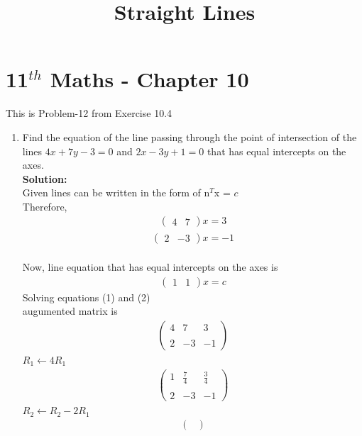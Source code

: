 \documentclass[12pt]{article}
\newcommand{\solution}{\noindent \textbf{Solution: }}
\newcommand{\myvec}[1]{\ensuremath{\begin{pmatrix}#1\end{pmatrix}}}
\begin{document}
\begin{center}
\title{\textbf{Straight Lines}}
\date{\vspace{-5ex}} %
\maketitle
\end{center}
\setcounter{page}{1}
\section*{11$^{th}$ Maths - Chapter 10}
This is Problem-12 from Exercise 10.4
\begin{enumerate}
    \item Find the equation of the line passing through the point of intersection of the lines $4x + 7y - 3 = 0$ and $2x - 3y + 1 = 0$ that has equal intercepts on the axes.\\
    \solution \\
    Given lines can be written in the form of n$^{T}$x = $c$
   \\Therefore,\\ \begin{align}
       \myvec{4&7}x=3
   \end{align} 
   \begin{align}
       \myvec{2&-3}x=-1
   \end{align}\\
   Now, line equation that has equal intercepts on the axes is
   \begin{align}
       \myvec{1 & 1}x=c
   \end{align}
   Solving equations (1) and (2)\\augumented matrix is
  \begin{align}
\begin{pmatrix}
    4 & 7 & 3 \\ \\
    2 & -3 & -1
  \end{pmatrix}
\end{align}
$R_1 \leftarrow 4 R_1$
\begin{align}
\begin{pmatrix}
    1 & \frac{7}{4} & \frac{3}{4} \\ \\
    2 & -3 & -1
  \end{pmatrix}
\end{align}
$R_2 \leftarrow R_2 - 2R_1$
\begin{align}
\begin{pmatrix}

\end{pmatrix}
\end{align}
\end{enumerate}
\end{document}
